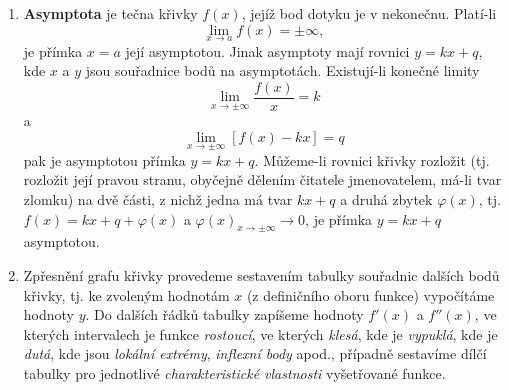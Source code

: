 {\begin{enumerate}
            je tak, že stanovíme hodnoty $x$, pro které je $f''(x)=0$ nebo neexistuje. Číslo $c$ je 
            inflexní bod, když existuje takové okolí bodu $c$, že pro $x>c$ je oblouk křivky 
            konvexní a pro $x<c$ konkávní. Je nutné si uvědomit, že když má $f'(x)$ konečnou 
            derivaci, je inflexní bod $c$ taky nulovým bodem druhé derivace čili kořenem rovnice 
            $f''(x)=0$. Obrácená věta neplatí, tj. z $f''(x)=0$ nevyplývá, že v bodě $c$ má $f'(x)$ 
            extrém a že bod $c$ je inflexním bodem.
      \item \textbf{Asymptota} je tečna křivky $f(x)$, jejíž bod dotyku je v nekonečnu. Platí-li  
            $$\lim_{x \to a}f(x) =  \pm\infty,$$ je přímka $x=a$ její asymptotou. Jinak asymptoty 
            mají rovnici $y=kx+q$, kde $x$ a $y$ jsou souřadnice bodů na asymptotách. Existují-li 
            konečné limity $$\lim_{x \to \pm\infty}\frac{f(x)}{x}=k$$  a $$\lim_{x \to 
            \pm\infty}[f(x)-kx] =q$$ pak je asymptotou přímka $y=kx+q$. Můžeme-li rovnici křivky 
            rozložit (tj. rozložit její pravou stranu, oby\-čejně dělením čitatele jmenovatelem, 
            má-li tvar zlomku) na dvě části, z nichž jedna má tvar $kx+q$ a druhá zbytek 
            $\varphi(x)$, tj. $f(x)=kx+q+\varphi(x)$ a $\varphi(x)_{x\rightarrow 
            \pm\infty}\rightarrow 0$, je přímka $y=kx+q$ asymptotou.
      \item Zpřesnění grafu křivky provedeme sestavením tabulky souřadnic dalších bodů křivky,  
            tj. ke zvoleným hodnotám $x$ (z definičního oboru funkce) vypočítáme hodnoty $y$. Do 
            dalších řádků tabulky zapíšeme hodnoty  $f'(x)$ a $f''(x)$, ve kterých intervalech je 
            funkce \emph{rostoucí}, ve kterých \emph{klesá}, kde je \emph{vypuklá}, kde je 
            \emph{dutá}, kde jsou \emph{lokální extrémy}, \emph{inflexní body} apod., 
            případně sestavíme dílčí tabulky pro jednotlivé \emph{charakteristické vlastnosti} vyšetřované funkce.
    \end{enumerate}
    

} %
\printbibliography[heading=subbibliography]
